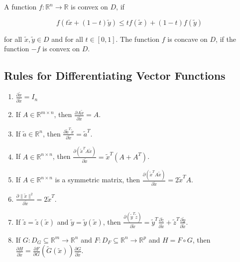 \documentclass{article}
\begin{document}
\begin{multicols}{2}
A function \( f: \mathbb{R}^n \rightarrow \mathbb{R} \) is convex on \( D \), if

\[ f(t \tilde{x} + (1-t) \tilde{y}) \leq t f(\tilde{x}) + (1-t) f(\tilde{y}) \]

for all \( \tilde{x}, \tilde{y} \in D \) and for all \( t \in [0, 1] \). The function \( f \) is concave on \( D \), if the function \( -f \) is convex on \( D \).

\subsection{Rules for Differentiating Vector Functions}

\begin{enumerate}
    \item \(\frac{\partial \tilde{x}}{\partial \tilde{x}} = I_n\)
    \item If \( A \in \mathbb{R}^{m \times n} \), then \( \frac{\partial A\tilde{x}}{\partial \tilde{x}} = A \).
    \item If \( \tilde{a} \in \mathbb{R}^n \), then \( \frac{\partial \tilde{a}^T\tilde{x}}{\partial \tilde{x}} = \tilde{a}^T \).
    \item If \( A \in \mathbb{R}^{n \times n} \), then \( \frac{\partial (\tilde{x}^T A\tilde{x})}{\partial \tilde{x}} = \tilde{x}^T(A + A^T) \).
    \item If \( A \in \mathbb{R}^{n \times n} \) is a symmetric matrix, then \( \frac{\partial (\tilde{x}^T A\tilde{x})}{\partial \tilde{x}} = 2\tilde{x}^T A \).
    \item \( \frac{\partial \|\tilde{x}\|^2}{\partial \tilde{x}} = 2\tilde{x}^T \).
    \item If \( \tilde{z} = \tilde{z}(\tilde{x}) \) and \( \tilde{y} = \tilde{y}(\tilde{x}) \), then \( \frac{\partial (\tilde{y}^T \tilde{z})}{\partial \tilde{x}} = \tilde{y}^T \frac{\partial \tilde{z}}{\partial \tilde{x}} + \tilde{z}^T \frac{\partial \tilde{y}}{\partial \tilde{x}} \).
    \item If \( G: D_G \subseteq \mathbb{R}^m \rightarrow \mathbb{R}^n \) and \( F: D_F \subseteq \mathbb{R}^n \rightarrow \mathbb{R}^p \) and \( H = F \circ G \), then \( \frac{\partial H}{\partial \tilde{x}} = \frac{\partial F}{\partial G} (\tilde{G}(\tilde{x})) \frac{\partial G}{\partial \tilde{x}} \).
\end{enumerate}

\end{multicols}
\end{document}
